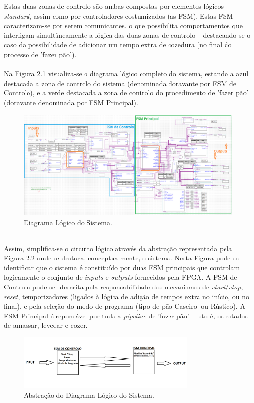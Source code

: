 \documentclass{report}
\begin{document}
Estas duas zonas de controlo são ambas compostas por elementos lógicos \textit{standard}, assim como por controladores costumizados (as FSM). Estas FSM caracterizam-se por serem comunicantes, o que possibilita comportamentos que interligam simultâneamente a lógica das duas zonas de controlo -- destacando-se o caso da possibilidade de adicionar um tempo extra de cozedura (no final do processo de 'fazer pão').
\\\\
Na Figura 2.1 visualiza-se o diagrama lógico completo do sistema, estando a azul destacada a zona de controlo do sistema (denominada doravante por FSM de Controlo), e a verde destacada a zona de controlo do procedimento de 'fazer pão' (doravante denominada por FSM Principal).
\begin{figure}[h!] %
	\center
	\includegraphics[width=335pt]{images/fase2v9_2}
	\caption{Diagrama Lógico do Sistema.}
	\label{fig:imagem1}
\end{figure}
\\
Assim, simplifica-se o circuito lógico através da abstração representada pela Figura 2.2 onde se destaca, conceptualmente, o sistema. Nesta Figura pode-se identificar que o sistema é constituído por duas FSM principais que controlam logicamente o conjunto de \textit{inputs} e \textit{outputs} fornecidos pela FPGA. A FSM de Controlo pode ser descrita pela responsabilidade dos mecanismos de \textit{start}/\textit{stop}, \textit{reset}, temporizadores (ligados à lógica de adição de tempos extra no início, ou no final), e pela seleção do modo de programa (tipo de pão Caseiro, ou Rústico). A FSM Principal é reponsável por toda a \textit{pipeline} de 'fazer pão' -- isto é, os estados de amassar, levedar e cozer.
\begin{figure}[h!] %
	\center
	\includegraphics[width=250pt]{images/SistemaAbstrato_2}
	\caption{Abstração do Diagrama Lógico do Sistema.}
	\label{fig:imagem2}
\end{figure}
\end{document}
